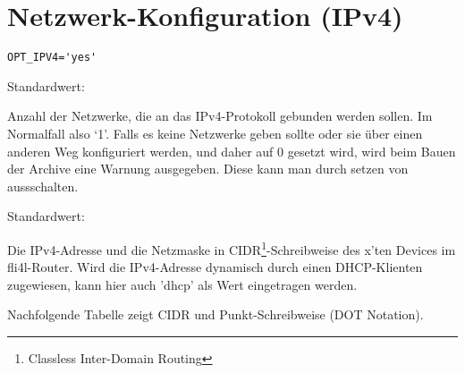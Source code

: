 \section{Netzwerk-Konfiguration (IPv4)}

\begin{description}
  \verb*?OPT_IPV4='yes'?

  
  Standardwert: 
  
  {Anzahl der Netzwerke, die an das IPv4-Pro\-to\-koll gebunden werden sollen.
  Im Normalfall also `1'. Falls es keine Netzwerke geben sollte oder sie über einen 
  anderen Weg konfiguriert werden, und daher  auf 0 gesetzt wird, 
  wird beim Bauen der Archive eine Warnung ausgegeben. Diese kann man durch setzen 
  von  aussschalten.}


  Standardwert: 

  {Die IPv4-Adresse und die Netzmaske in CIDR\footnote{Classless Inter-Domain
   Routing}-Schreibweise des x'ten Devices im fli4l-Router. Wird die
   IPv4-Adresse dynamisch durch einen DHCP-Klienten zugewiesen, kann
   hier auch 'dhcp' als Wert eingetragen werden.

   Nachfolgende Tabelle zeigt CIDR und Punkt-Schreibweise (DOT
   Notation).


}
\end{description}
